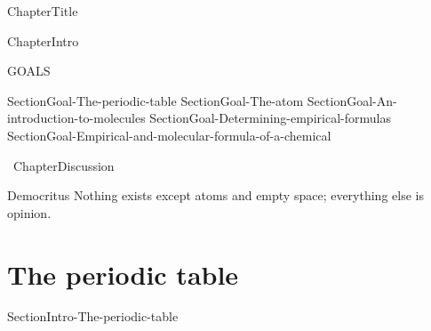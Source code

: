 \documentclass[main.tex]{subfiles}
\newcommand\chapterlabel{Ch-Table}\setcounter{figurenewcounter}{0}\setcounter{tablenewcounter}{0}\setcounter{formulanewcounter}{0}
\begin{document}
\linenumbers


 {ChapterTitle}
 

 
 
\begin{marginfigure}
      \texttt{[image: ../\{\\chapterlabel]}/figure1}
   \end{marginfigure}
   
 {ChapterIntro}
\begin{marginfigure}%
\begin{mytcbox}{GOALS}
\begin{enumerate}[label=\protect\circled{\color{white}\arabic*}]
  {SectionGoal-The-periodic-table}
 {SectionGoal-The-atom}
  {SectionGoal-An-introduction-to-molecules}
 {SectionGoal-Determining-empirical-formulas}
 {SectionGoal-Empirical-and-molecular-formula-of-a-chemical}
\end{enumerate}
\end{mytcbox}
\vspace{1cm}
\begin{tcolorbox}[enhanced,colback=red!5!white,colframe=black!50!red,boxrule=1pt,
  arc=0pt,outer arc=0pt,drop heavy lifted shadow]
\faGears\ 
 {ChapterDiscussion}
 \end{tcolorbox}

\vspace{1cm}    

\begin{shadequote}[l]{Democritus}
Nothing exists except atoms and empty space; everything else is opinion.
\end{shadequote}   

\end{marginfigure}%









\section{The periodic table}
{SectionIntro-The-periodic-table}
\end{document}
